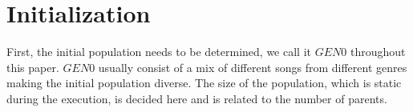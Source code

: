 \section{Initialization}
First, the initial population needs to be determined, we call it $GEN0$ throughout this paper. $GEN0$ usually consist of a mix of different songs from different genres making the initial population diverse. The size of the population, which is static during the execution, is decided here and is related to the number of parents. %